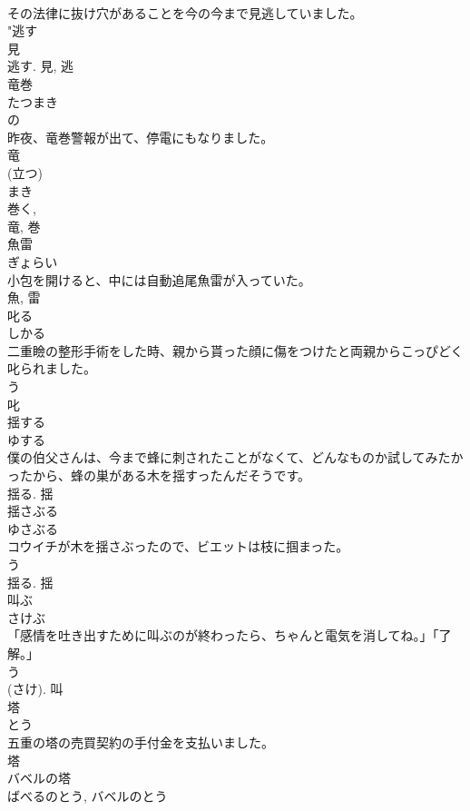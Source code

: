 \documentclass[8pt]{extreport}
\begin{document}
\begin{CJK}{UTF8}{min}
\\	その法律に抜け穴があることを今の今まで見逃していました。	
\\	"逃す 
\\	見 
\\	逃す.	見, 逃	
\\	竜巻	
\\	たつまき	
\\	の 
\\	昨夜、竜巻警報が出て、停電にもなりました。	
\\	竜 
\\	(立つ) 
\\	まき 
\\	巻く, 
\\	竜, 巻	
\\	魚雷	
\\	ぎょらい	
\\	小包を開けると、中には自動追尾魚雷が入っていた。	
\\	魚, 雷	
\\	叱る	
\\	しかる	
\\	二重瞼の整形手術をした時、親から貰った顔に傷をつけたと両親からこっぴどく叱られました。	
\\	う 
\\	叱	
\\	揺する	
\\	ゆする	
\\	僕の伯父さんは、今まで蜂に刺されたことがなくて、どんなものか試してみたかったから、蜂の巣がある木を揺すったんだそうです。	
\\	揺る.	揺	
\\	揺さぶる	
\\	ゆさぶる	
\\	コウイチが木を揺さぶったので、ビエットは枝に掴まった。	
\\	う 
\\	揺る.	揺	
\\	叫ぶ	
\\	さけぶ	
\\	「感情を吐き出すために叫ぶのが終わったら、ちゃんと電気を消してね。」「了解。」	
\\	う 
\\	(さけ).	叫	
\\	塔	
\\	とう	
\\	五重の塔の売買契約の手付金を支払いました。	
\\	塔	
\\	バベルの塔	
\\	ばべるのとう, バベルのとう	

\end{CJK}
\end{document}
